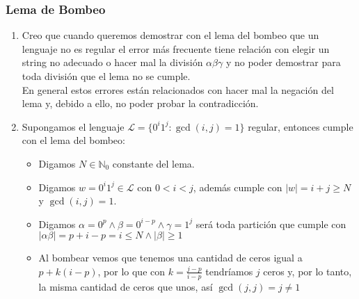 \documentclass[spanish, fleqn]{article}
\begin{document}
	\subsubsection*{Lema de Bombeo}
		\begin{enumerate}
			\item
				Creo que cuando queremos demostrar con el lema del bombeo que
				un lenguaje no es regular el error más frecuente tiene
				relación con elegir un string no adecuado o hacer mal la
				división $\alpha\beta\gamma$ y no poder demostrar para toda
				división que el lema no se cumple.\\
				En general estos errores están relacionados con hacer mal la
				negación del lema y, debido a ello, no poder probar la
				contradicción.

			\item
				Supongamos el lenguaje $\mathscr{L} = \{0^i1^j: \gcd(i,j)=1\}$
				regular, entonces cumple con el lema del bombeo:
				\begin{itemize}
					\item
						Digamos $N \in \mathbb{N}_{0}$ constante del lema.
					\item 
						Digamos $w = 0^{i}1^{j} \in \mathscr{L}$ con $0< i< j$,
						además cumple con $|w| = i+j \geq N$ y $\gcd(i,j) = 1$.
					\item
						Digamos $\alpha = 0^{p} \land \beta = 0^{i-p} \land
						\gamma = 1^{j}$ será toda partición que cumple con
						$|\alpha\beta| = p + i - p = i \leq N \land |\beta| 
						\geq 1$

					\item
						Al bombear vemos que tenemos una cantidad de ceros
						igual a $p + k(i-p)$, por lo que con $k = 
						\frac{j-p}{i-p}$ tendríamos $j$ ceros y, por lo tanto,
						la misma cantidad de ceros que unos, así $\gcd(j,j) = 
						j \neq 1$

				\end{itemize}

		\end{enumerate}
\end{document}

